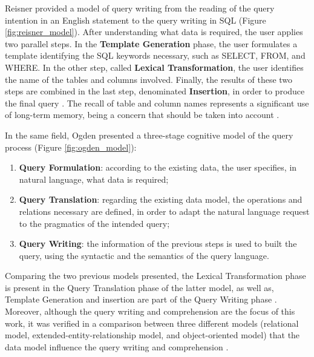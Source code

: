 Reisner \cite{humanFactorStudiesOfDatabaseQueryLanguages} provided a model of query writing from the reading of the query intention in an English statement to the query writing in SQL (Figure \ref{fig:reisner_model}). After understanding what data is required, the user applies two parallel steps. In the \textbf{Template Generation} phase, the user formulates a template identifying the SQL keywords necessary, such as SELECT, FROM, and WHERE. In the other step, called \textbf{Lexical Transformation}, the user identifies the name of the tables and columns involved. Finally, the results of these two steps are combined in the last step, denominated \textbf{Insertion}, in order to produce the final query \cite{humanFactorStudiesOfDatabaseQueryLanguages}. The recall of table and column names represents a significant use of long-term memory, being a concern that should be taken into account \cite{userErrorsInDatabaseQueryComposition}.

In the same field, Ogden \cite{implicationsOfACognitiveModelOfDatabaseQuery} presented a three-stage cognitive model of the query process (Figure \ref{fig:ogden_model}):

\begin{enumerate}
  \item \textbf{Query Formulation}: according to the existing data, the user specifies, in natural language, what data is required;
  \item \textbf{Query Translation}: regarding the existing data model, the operations and relations necessary are defined, in order to adapt the natural language request to the pragmatics of the intended query;
  \item \textbf{Query Writing}: the information of the previous steps is used to built the query, using the syntactic and the semantics of the query language.
\end{enumerate}

Comparing the two previous models presented, the Lexical Transformation phase is present in the Query Translation phase of the latter model, as well as, Template Generation and insertion are part of the Query Writing phase \cite{anEvaluationOfNoviceEndUserComputingPerformance}. Moreover, although the query writing and comprehension are the focus of this work, it was verified in a comparison between three different models (relational model, extended-entity-relationship model, and object-oriented model) that the data model influence the query writing and comprehension \cite{anEvaluationOfNoviceEndUserComputingPerformance}.


